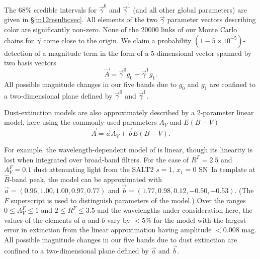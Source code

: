 \documentclass[trackchanges]{aastex62}   	%
\begin{document}
The 68\% credible intervals for $\vec{\gamma}^0$ and $\vec{\gamma}^1$ (and all other global parameters) are given in \S\ref{m12results:sec}.
All elements of the two $\vec{\gamma}$ parameter vectors 
describing color
are significantly non-zero.
None of the 20000 links of 
our Monte Carlo chains for $\vec{\gamma}$ come close to the origin.   We claim 
a probability $(1-5\times 10^{-5})$-detection of
a magnitude term in the form of a 5-dimensional vector spanned by two basis vectors
\begin{equation}
\vec{A} = \vec{\gamma}^0 g_0 +  \vec{\gamma}^1 g_1.
\end{equation}
All possible magnitude changes in our five bands due to $g_0$ and $g_1$ are confined to a two-dimensional
plane defined by $\vec{\gamma}^0$ and  $\vec{\gamma}^1$. 

Dust-extinction
models are also approximately described by a 2-parameter linear model, here 
using the commonly-used parameters $A_V$ and $E(B-V)$
\begin{equation}
\vec{A} =\vec{ a}  A_{V} + \vec{b} E(B-V).
\label{f99:eqn}
\end{equation}

For example,   the wavelength-dependent model of  \citet{1989ApJ...345..245C} is linear,
though its linearity is lost when integrated over broad-band filters.
For the case of
$R^F=2.5$ and $A^F_V=0.1$ dust attenuating light from the SALT2
\citep{2007A&A...466...11G} $s=1$, $x_1=0$ SN~Ia template at ${\hat{B}}$-band peak, the 
 model
can be approximated with
$\vec{a} = (0.96,   1.00,   1.00,   0.97,   0.77)$ and $\vec{b}=(  1.77,   0.98,   0.12,  -0.50,  -0.53)$.
(The $F$ superscript is used to distinguish parameters of the  model.)
Over the ranges
 $0\le A^F_V\le 1$ and $2 \le R^F \le 3.5$ 
and the wavelengths under consideration here,  the values of the elements of $a$ and $b$ vary by $<5$\%
for the
 model with
 the largest error in extinction from the linear approximation having amplitude $<0.008$ mag.
All possible magnitude changes in our five bands due to    dust extinction are confined to a two-dimensional
plane defined by $\vec{a}$ and  $\vec{b}$. 
\end{document}
